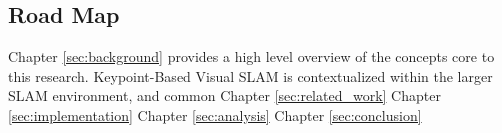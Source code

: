 \subsection{Road Map}

Chapter \ref{sec:background} provides a high level overview of the concepts core to this research. Keypoint-Based Visual SLAM is contextualized within the larger SLAM environment, and common 
Chapter \ref{sec:related_work}
Chapter \ref{sec:implementation}
Chapter \ref{sec:analysis}
Chapter \ref{sec:conclusion}
